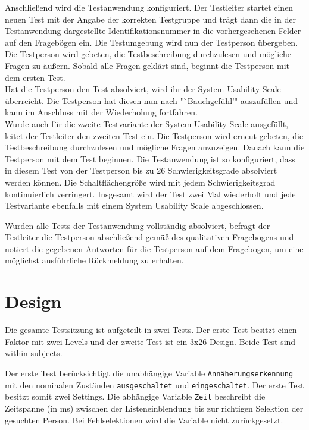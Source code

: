 \documentclass[a4paper,12pt,bibliography=totoc]{scrreprt}%
\begin{document}
Anschließend wird die Testanwendung konfiguriert. Der Testleiter startet einen neuen Test mit der Angabe der korrekten Testgruppe und trägt dann die in der Testanwendung dargestellte Identifikationsnummer in die vorhergesehenen Felder auf den Fragebögen ein. Die Testumgebung wird nun der Testperson übergeben. Die Testperson wird gebeten, die Testbeschreibung durchzulesen und mögliche Fragen zu äußern. Sobald alle Fragen geklärt sind, beginnt die Testperson mit dem ersten Test.\\
Hat die Testperson den Test absolviert, wird ihr der System Usability Scale überreicht. Die Testperson hat diesen nun nach "`Bauchgefühl'" auszufüllen und kann im Anschluss mit der Wiederholung fortfahren.\\
Wurde auch für die zweite Testvariante der System Usability Scale ausgefüllt, leitet der Testleiter den zweiten Test ein. Die Testperson wird erneut gebeten, die Testbeschreibung durchzulesen und mögliche Fragen anzuzeigen. Danach kann die Testperson mit dem Test beginnen. Die Testanwendung ist so konfiguriert, dass in diesem Test von der Testperson bis zu 26 Schwierigkeitsgrade absolviert werden können. Die Schaltflächengröße wird mit jedem Schwierigkeitsgrad kontinuierlich verringert. Insgesamt wird der Test zwei Mal wiederholt und jede Testvariante ebenfalls mit einem System Usability Scale abgeschlossen.

Wurden alle Tests der Testanwendung vollständig absolviert, befragt der Testleiter die Testperson abschließend gemäß des qualitativen Fragebogens und notiert die gegebenen Antworten für die Testperson auf dem Fragebogen, um eine möglichst ausführliche Rückmeldung zu erhalten. 

\section{Design}
Die gesamte Testsitzung ist aufgeteilt in zwei Tests. Der erste Test besitzt einen Faktor mit zwei Levels und der zweite Test ist ein 3x26 Design. Beide Test sind within-subjects.

Der erste Test berücksichtigt die unabhängige Variable {\tt Annäherungserkennung} mit den nominalen Zuständen {\tt ausgeschaltet} und {\tt eingeschaltet}. Der erste Test besitzt somit zwei Settings. Die abhängige Variable {\tt Zeit} beschreibt die Zeitspanne (in ms) zwischen der Listeneinblendung bis zur richtigen Selektion der gesuchten Person. Bei Fehlselektionen wird die Variable nicht zurückgesetzt.
\end{document}
